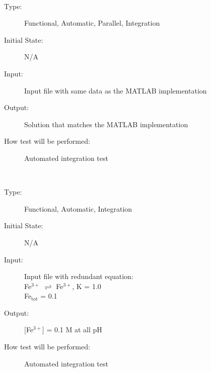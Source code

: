 \documentclass[12pt, titlepage]{article}
\newcounter{testnum} %
\begin{document}
\begin{addmargin}[2em]{0em}
\\
\begin{addmargin}[2em]{0em}
\begin{description}
\item[Type:] Functional, Automatic, Parallel, Integration
					
\item[Initial State:] N/A
					
\item[Input:] Input file with same data as the MATLAB implementation\\
					
\item[Output:] Solution that matches the MATLAB implementation\\
					
\item[How test will be performed:] Automated integration test\\
\end{description}
\end{addmargin}

\\
\begin{addmargin}[2em]{0em}
\begin{description}
\item[Type:] Functional, Automatic, Integration
					
\item[Initial State:] N/A
					
\item[Input:] Input file with redundant equation:\\
Fe$^{3+}$ $\rightleftharpoons$ Fe$^{3+}$, K = 1.0\\
Fe$_{\text{tot}}$ = 0.1\\
					
\item[Output:] [Fe$^{3+}$] = 0.1 M at all pH
					
\item[How test will be performed:] Automated integration test\\
\end{description}
\end{addmargin}
\end{addmargin}
\end{document}
